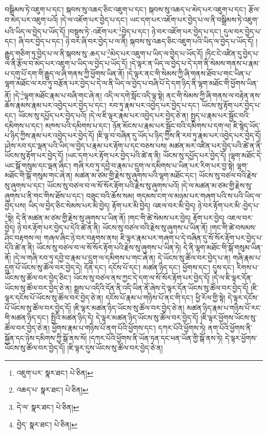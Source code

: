 བསྒྲིམས་ཏེ་འཇུག་པ་དང་། སྐབས་སུ་འཆད་ཅིང་འཇུག་པ་དང་། སྐབས་སུ་འཆད་པ་མེད་པར་འཇུག་པ་དང་། རྩོལ་བ་མེད་པར་འཇུག་པའོ། །དེ་ལ་འཇོག་པར་བྱེད་པ་དང་། ཡང་དག་པར་འཇོག་པར་བྱེད་པ་ལ་ནི་བསྒྲིམས་ཏེ་འཇུག་པའི་ཡིད་ལ་བྱེད་པ་ཡོད་དོ། །བསྡུས་ཏེ་:འཇོག་པར་\footnote{འཇུག་པར་  སྣར་ཐང་།  པེ་ཅིན། }བྱེད་པ་དང་། ཉེ་བར་འཇོག་པར་བྱེད་པ་དང་། དུལ་བར་བྱེད་པ་དང་། ཞི་བར་བྱེད་པ་དང་། ཉེ་བར་ཞི་བར་བྱེད་པ་ལ་ནི། སྐབས་སུ་འཆད་ཅིང་འཇུག་པའི་ཡིད་ལ་བྱེད་པ་ཡོད་དོ། །རྒྱུད་གཅིག་ཏུ་བྱེད་པ་ལ་ནི་སྐབས་སུ་:ཆད་པ་\footnote{འཆད་པ་  སྣར་ཐང་།  པེ་ཅིན། }མེད་པར་འཇུག་པ་ཡིད་ལ་བྱེད་པ་ཡོད་དོ། །ཏིང་ངེ་འཛིན་དུ་བྱེད་པ་ལ་ནི་རྩོལ་བ་མེད་པར་འཇུག་པ་ཡིད་ལ་བྱེད་པ་ཡོད་དོ། །དེ་ལྟར་ན་ཡིད་ལ་བྱེད་པ་དེ་དག་ནི་སེམས་གནས་པ་རྣམ་པ་དགུ་པོ་དག་གི་རྒྱུད་ལ་ཞི་གནས་ཀྱི་ཕྱོགས་ཡིན་ནོ། །དེ་ལྟར་ནང་གི་སེམས་ཀྱི་ཞི་གནས་ཐོབ་པ་གང་ཡིན་པ་ལྷག་མཐོང་ལ་རབ་ཏུ་བརྩོན་པར་བྱེད་པ་དེ་ལ་ནི་ཡིད་ལ་བྱེད་པ་བཞི་པོ་དེ་དག་ཉིད་ནི་ལྷག་མཐོང་གི་ཕྱོགས་ཡིན་ནོ། །དེ་\footnote{དེ་ལ་  སྣར་ཐང་།  པེ་ཅིན། }ལྷག་མཐོང་རྣམ་པ་བཞི་གང་ཞེ་ན། འདི་ལ་དགེ་སློང་འདི་ལྟ་སྟེ། ནང་གི་སེམས་ཀྱི་ཞི་གནས་ལ་བརྟེན་ནས་ཆོས་རྣམས་རྣམ་པར་འབྱེད་པར་བྱེད་པ་དང་། རབ་ཏུ་རྣམ་པར་འབྱེད་པར་བྱེད་པ་དང་། ཡོངས་སུ་རྟོག་པར་བྱེད་པ་དང་། ཡོངས་སུ་དཔྱོད་པར་བྱེད་པའོ། །དེ་ལ་ཇི་ལྟར་རྣམ་པར་འབྱེད་པར་བྱེད་ཅེ་ན། སྤྱད་པ་རྣམ་པར་སྦྱོང་བའི་དམིགས་པ་དང་། མཁས་པའི་དམིགས་པ་དང་། ཉོན་མོངས་པ་རྣམ་པར་སྦྱོང་བའི་དམིགས་པ་དག་ལ། ཇི་སྙེད་ཡོད་པ་ཉིད་ཀྱིས་རྣམ་པར་འབྱེད་པར་བྱེད་དོ། །ཇི་ལྟ་བ་བཞིན་དུ་ཡོད་པ་ཉིད་ཀྱིས་ནི་རབ་ཏུ་རྣམ་པར་འབྱེད་པར་བྱེད་དོ། །ཤེས་རབ་དང་ལྡན་པའི་ཡིད་ལ་བྱེད་པ་རྣམ་པར་རྟོག་པ་དང་བཅས་པས། མཚན་མར་འཛིན་པར་བྱེད་པའི་ཚེ་ན་ནི་ཡོངས་སུ་རྟོག་པར་བྱེད་དོ། །ཡང་དག་པར་རྟོག་པར་བྱེད་པའི་ཚེ་ན་ནི། ཡོངས་སུ་དཔྱོད་པར་བྱེད་དོ། །ལྷག་མཐོང་དེ་ཡང་སྒོ་གསུམ་དང་ལྡན་ཞིང་། གཞི་རབ་ཏུ་དབྱེ་བ་རྣམ་པ་དྲུག་ལ་དམིགས་པ་ཡིན་པར་རིག་པར་བྱ་སྟེ། ལྷག་མཐོང་གི་སྒོ་གསུམ་གང་ཞེ་ན། མཚན་མ་ཙམ་གྱི་རྗེས་སུ་ཞུགས་པའི་ལྷག་མཐོང་དང་། ཡོངས་སུ་བཙལ་བའི་རྗེས་སུ་ཞུགས་པ་དང་། ཡོངས་སུ་བཙལ་བ་ལ་སོ་སོར་རྟོག་པའི་རྗེས་སུ་ཞུགས་པའོ། །དེ་ལ་མཚན་མ་ཙམ་གྱི་རྗེས་སུ་ཞུགས་པ་ནི་གང་གིས་ཐོས་པ་དང་། བཟུང་བའི་ཆོས་སམ། གདམས་ངག་ལ་མཉམ་པར་གཞག་པའི་ས་པའི་ཡིད་ལ་བྱེད་པས། ཡིད་ལ་བྱེད་ཅིང་སེམས་པར་མི་བྱེད། རྟོག་པར་མི་བྱེད། འཇལ་བར་མི་བྱེད། ཉེ་བར་རྟོག་པར་མི་:བྱེད་པ་\footnote{བྱེད་  སྣར་ཐང་།  པེ་ཅིན། }སྟེ། དེ་ནི་མཚན་མ་ཙམ་གྱི་རྗེས་སུ་ཞུགས་པ་ཡིན་ནོ། །གང་གི་ཚེ་སེམས་པར་བྱེད། རྟོག་པར་བྱེད། འཇལ་བར་བྱེད། ཉེ་བར་རྟོག་པར་བྱེད་པ་དེའི་ཚེ་ན་ནི། ཡོངས་སུ་བཙལ་བའི་རྗེས་སུ་ཞུགས་པ་ཡིན་ནོ། །གང་གི་ཚེ་བསམས་ཤིང་བརྟགས་ལ། གཞལ་ཞིང་ཉེ་བར་བརྟགས་ནས། ཇི་ལྟར་རྣམ་པར་གཞག་པ་དེ་བཞིན་དུ་སོ་སོར་རྟོག་པར་བྱེད་པ་དེའི་ཚེ་ན་ནི། ཡོངས་སུ་བཙལ་བ་ལ་སོ་སོར་རྟོག་པའི་རྗེས་སུ་ཞུགས་པ་ཡིན་ཏེ། དེ་ནི་ལྷག་མཐོང་གི་སྒོ་གསུམ་ཡིན་ནོ། །དེ་ལ་གཞི་རབ་ཏུ་དབྱེ་བ་རྣམ་པ་དྲུག་ལ་དམིགས་པ་གང་ཞེ་ན། དེ་ཡོངས་སུ་ཚོལ་བར་བྱེད་པ་ན། གཞི་རྣམ་པ་དྲུག་པོ་ཡོངས་སུ་ཚོལ་བར་བྱེད་དེ། དོན་དང་། དངོས་པོ་དང་། མཚན་ཉིད་དང་། ཕྱོགས་དང་། དུས་དང་། རིགས་པ་ཡོངས་སུ་ཚོལ་བར་བྱེད་ཅིང་། ཡོངས་སུ་བཙལ་ནས་ཀྱང་དེ་དག་ལ་སོ་སོར་རྟོག་པར་བྱེད་དོ། །དེ་ལ་ཇི་ལྟར་དོན་ཡོངས་སུ་ཚོལ་བར་བྱེད་ཅེ་ན། སྨྲས་པ་འདིའི་དོན་ནི་འདི་ཡིན་ནོ་ཞེས་དེ་ལྟར་དོན་ཡོངས་སུ་ཚོལ་བར་བྱེད་དོ། །ཇི་ལྟར་དངོས་པོ་ཡོངས་སུ་ཚོལ་བར་བྱེད་ཅེ་ན། དངོས་པོ་རྣམ་པ་གཉིས་པོ་ནང་གི་དང་། ཕྱི་རོལ་གྱི་སྟེ། དེ་ལྟར་དངོས་པོ་ཡོངས་སུ་ཚོལ་བར་བྱེད་དོ། །ཇི་ལྟར་མཚན་ཉིད་ཡོངས་སུ་ཚོལ་བར་བྱེད་ཅེ་ན། མཚན་ཉིད་རྣམ་པ་གཉིས་པོ་རང་གི་མཚན་ཉིད་དང་། སྤྱིའི་མཚན་ཉིད་དེ། དེ་ལྟར་མཚན་ཉིད་ཡོངས་སུ་ཚོལ་བར་བྱེད་དོ། །ཇི་ལྟར་ཕྱོགས་ཡོངས་སུ་ཚོལ་བར་བྱེད་ཅེ་ན། ཕྱོགས་རྣམ་པ་གཉིས་པོ་ནག་པོའི་ཕྱོགས་དང་། དཀར་པོའི་ཕྱོགས་ཏེ། ནག་པོའི་ཕྱོགས་ནི་སྐྱོན་དང་ཉེས་དམིགས་ཀྱི་སྒོ་ནས་སོ། །དཀར་པོའི་ཕྱོགས་ནི་ཡོན་ཏན་དང་ཕན་ཡོན་གྱི་སྒོ་ནས་ཏེ། དེ་ལྟར་ཕྱོགས་ཡོངས་སུ་ཚོལ་བར་བྱེད་དོ། །ཇི་ལྟར་དུས་ཡོངས་སུ་ཚོལ་བར་བྱེད་ཅེ་ན། 